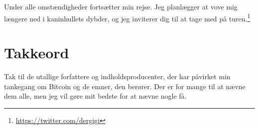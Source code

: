 \documentclass[paper=6in:9in,pagesize=pdftex,
               headinclude=on,footinclude=on,12pt]{scrbook}
\begin{document}
Under alle omstændigheder fortsætter min rejse. Jeg planlægger at vove mig længere ned i kaninhullets dybder, og jeg inviterer dig til at tage med på turen.\footnote{\url{https://twitter.com/dergigi}}%
%

\cleardoublepage

\chapter*{Takkeord}

Tak til de utallige forfattere og indholdsproducenter, der har påvirket min tankegang om Bitcoin og de emner, den berører. Der er for mange til at nævne dem alle, men jeg vil gøre mit bedste for at nævne nogle få.\begin{itemize}

\end{itemize}
\end{document}
